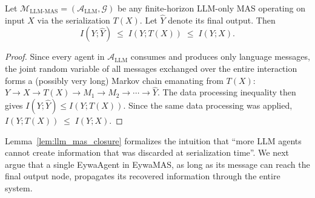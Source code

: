 \documentclass{llmxive}
\begin{document}
{\begin{lemma}
\label{lem:llm_mas_closure}
Let $\mathcal{M}_{\mathrm{LLM\text{-}MAS}}=(\mathcal{A}_{\mathrm{LLM}},\mathcal{G})$ be any finite-horizon LLM-only MAS operating on input $X$ via the serialization $T(X)$. Let $\hat Y$ denote its final output. Then
\begin{equation}
I(Y;\hat Y)\;\le\;I(Y;T(X))\;\le\;I(Y; X).
\end{equation}
\end{lemma}
\begin{proof}
Since every agent in $\mathcal{A}_{\mathrm{LLM}}$ consumes and produces only language messages, the joint random variable of all messages exchanged over the entire interaction forms a (possibly very long) Markov chain emanating from $T(X)$: $Y\to X\to T(X)\to M_1\to M_2\to\cdots\to \hat Y$. The data processing inequality then gives $I(Y;\hat Y)\le I(Y;T(X))$. Since the same data processing was applied, $I(Y;T(X))\;\le\;I(Y; X)$.
\end{proof}

Lemma~\ref{lem:llm_mas_closure} formalizes the intuition that ``more LLM agents cannot create information that was discarded at serialization time''. We next argue that a single EywaAgent in EywaMAS, as long as its message can reach the final output node, propagates its recovered information through the entire system.

}
\end{document}

